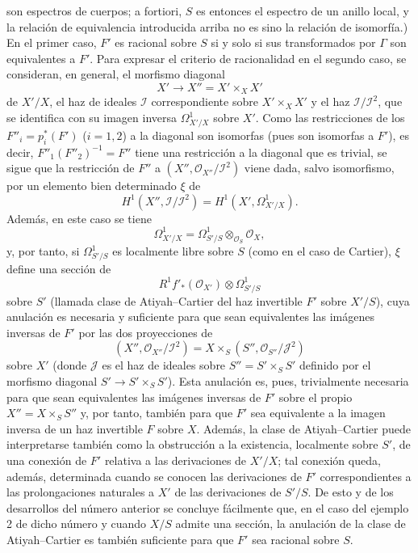 son espectros de cuerpos; a fortiori, $S$ es entonces el espectro de un anillo
local, y la relación de equivalencia introducida arriba no es sino la relación
de isomorfía.) En el primer caso, $F'$ es racional sobre $S$ si y solo si sus
transformados por $\Gamma$ son equivalentes a $F'$. Para expresar el criterio
de racionalidad en el segundo caso, se consideran, en general, el morfismo
diagonal
\[
  X'\longrightarrow X''=X'\times_XX'
\]
de $X'/X$, el haz de ideales $\mathcal I$ correspondiente sobre
$X'\times_XX'$ y el haz $\mathcal I/\mathcal I^2$, que se identifica con su
imagen inversa $\Omega^1_{X'/X}$ sobre $X'$. Como las restricciones de los
$F''_i=p_i^*(F')$ ($i=1,2$) a la diagonal son isomorfas (pues son isomorfas a
$F'$), es decir, $F''_1(F''_2)^{-1}=F''$ tiene una restricción a la diagonal
que es trivial, se sigue que la restricción de $F''$ a
$(X'',\mathcal O_{X''}/\mathcal I^2)$ viene dada, salvo isomorfismo, por un
elemento bien determinado $\xi$ de
\[
  H^1(X'',\mathcal I/\mathcal I^2)
  =H^1(X',\Omega^1_{X'/X}).
\]
Además, en este caso se tiene
\[
  \Omega^1_{X'/X}
  =\Omega^1_{S'/S}\otimes_{\mathcal O_S}\mathcal O_X,
\]
y, por tanto, si $\Omega^1_{S'/S}$ es localmente libre sobre $S$ (como en el
caso de Cartier), $\xi$ define una sección de
\[
  R^1f'_*(\mathcal O_{X'})\otimes\Omega^1_{S'/S}
\]
sobre $S'$ (llamada clase de Atiyah--Cartier del haz invertible $F'$ sobre
$X'/S$), cuya anulación es necesaria y suficiente para que sean equivalentes
las imágenes inversas de $F'$ por las dos proyecciones de
\[
  (X'',\mathcal O_{X''}/\mathcal I^2)
  =X\times_S(S'',\mathcal O_{S''}/\mathcal J^2)
\]
sobre $X'$ (donde $\mathcal J$ es el haz de ideales sobre
$S''=S'\times_SS'$ definido por el morfismo diagonal
$S'\longrightarrow S'\times_SS'$). Esta anulación es, pues, trivialmente
necesaria para que sean equivalentes las imágenes inversas de $F'$ sobre el
propio $X''=X\times_SS''$ y, por tanto, también para que $F'$ sea equivalente
a la imagen inversa de un haz invertible $F$ sobre $X$. Además, la clase de
Atiyah--Cartier puede interpretarse también como la obstrucción a la existencia,
localmente sobre $S'$, de una conexión de $F'$ relativa a las derivaciones de
$X'/X$; tal conexión queda, además, determinada cuando se conocen las
derivaciones de $F'$ correspondientes a las prolongaciones naturales a $X'$ de
las derivaciones de $S'/S$. De esto y de los desarrollos del número anterior se
concluye fácilmente que, en el caso del ejemplo 2 de dicho número y cuando
$X/S$ admite una sección, la anulación de la clase de Atiyah--Cartier es también
suficiente para que $F'$ sea racional sobre $S$.

